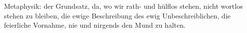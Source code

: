 Metaphysik: der Grundsatz, da, wo wir rath- und hülflos stehen, nicht wortlos stehen zu bleiben, die ewige Beschreibung des ewig Unbeschreiblichen, die feierliche Vornahme, nie und nirgends den Mund zu halten.
\par

